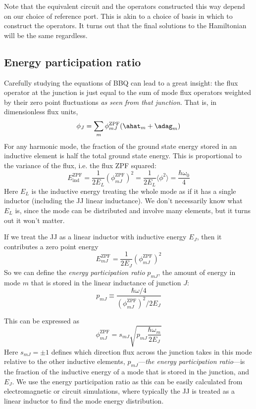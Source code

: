 Note that the equivalent circuit and the operators constructed this way depend on our choice of reference port. This is akin to a choice of basis in which to construct the operators. It turns out that the final solutions to the Hamiltonian will be the same regardless.


\subsection{Energy participation ratio}
Carefully studying the equations of BBQ can lead to a great insight: the flux operator at the junction is just equal to the sum of mode flux operators weighted by their zero point fluctuations \textit{as seen from that junction}. That is, in dimensionless flux units,
\begin{equation}
	\label{eq:EPRfluxsum}
	\phi_J = \sum_m \phi_{mJ}^\mathrm{ZPF} (\ahat_m + \adag_m)
\end{equation}
For any harmonic mode, the fraction of the ground state energy stored in an inductive element is half the total ground state energy. This is proportional to the variance of the flux, i.e. the flux ZPF squared:
\begin{equation*}
	E_\mathrm{ind}^\mathrm{ZPF} = \frac{1}{2 E_L} \left(\phi_{mJ}^\mathrm{ZPF}\right)^2 = \frac{1}{2 E_L} \langle \phi^2\rangle = \frac{\hbar \omega_0}{4}
\end{equation*}
Here $E_L$ is the inductive energy treating the whole mode as if it has a single inductor (including the JJ linear inductance). We don't necessarily know what $E_L$ is, since the mode can be distributed and involve many elements, but it turns out it won't matter.

If we treat the JJ as a linear inductor with inductive energy $E_J$, then it contributes a zero point energy
\begin{equation*}
	E_{mJ}^\mathrm{ZPF} = \frac{1}{2 E_J}\left(\phi_{mJ}^\mathrm{ZPF}\right)^2
\end{equation*}
So we can define the \textit{energy participation ratio} $p_{mJ}$, the amount of energy in mode $m$ that is stored in the linear inductance of junction $J$:
\begin{equation}
	p_{mJ} \equiv \frac{\hbar \omega / 4}{\left(\phi_{mJ}^\mathrm{ZPF}\right)^2 / 2 E_J}
\end{equation}

This can be expressed as
\begin{equation}
	\label{eq:EPRfluxone}
	\phi_{mJ}^\mathrm{ZPF} = s_{mJ} \sqrt{p_{mJ}\frac{\hbar \omega_m}{2E_J}}
\end{equation}
Here $s_{mJ} = \pm 1$ defines which direction flux across the junction takes in this mode relative to the other inductive elements, $p_{mJ}$---\textit{the energy participation ratio}---is the fraction of the inductive energy of a mode that is stored in the junction, and $E_J$. We use the energy participation ratio as this can be easily calculated from electromagnetic or circuit simulations, where typically the JJ is treated as a linear inductor to find the mode energy distribution.

